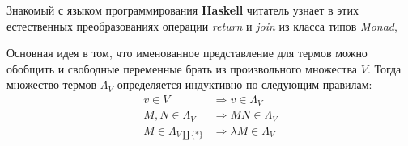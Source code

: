 Знакомый с языком программирования \textbf{Haskell} читатель узнает в этих естественных преобразованиях операции \textit{return} и \textit{join} из класса типов \textit{Monad}, 

Основная идея в том, что именованное представление для термов можно обобщить и свободные переменные брать из произвольного множества $V$. Тогда множество термов $\Lambda_{V}$ определяется индуктивно по следующим правилам:
\begin{align*}
  v \in V &\Rightarrow v \in \Lambda_{V} \\
  M, N \in \Lambda_{V} &\Rightarrow M N \in \Lambda_{V} \\
  M \in \Lambda_{V \coprod \{*\}} &\Rightarrow \lambda M \in \Lambda_{V}
\end{align*}
